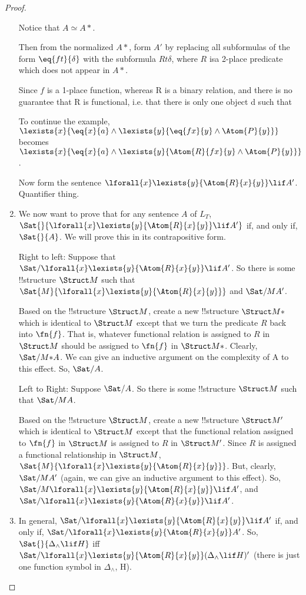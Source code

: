 \documentclass[../../include/open-logic-section]{subfiles}
\begin{document}
\begin{proof}
\begin{enumerate}
Notice that $ A \simeq A*$.

Then from the normalized $A*$, form $A'$ by replacing all subformulas of
the form $\eq{ft}{\delta}$ with the subformula $R{t}{\delta}$, where $R$
isa 2-place predicate which does not appear in $A*$.

Since $f$ is a 1-place function, whereas R is a binary relation, and there
is no guarantee that R is functional, i.e. that there is only one object d
such that

To continue the example, $\lexists{x}{\eq{x}{a} \land
\lexists{y}{\eq{fx}{y} \land \Atom{P}{y}}}$ becomes $\lexists{x}{\eq{x}{a}
\land \lexists{y}{\Atom{R}{fx}{y} \land \Atom{P}{y}}}$.

Now form the sentence $\lforall{x}\lexists{y}{\Atom{R}{x}{y}}\lif A'$.
Quantifier thing.

\item We now want to prove that for any sentence $A$ of $L_T$,
$\Sat{}{\lforall{x}\lexists{y}{\Atom{R}{x}{y}}\lif A'}$ if, and only if,
$\Sat{}{A}$. We will prove this in its contrapositive form.

Right to left: Suppose that
$\Sat/{}{\lforall{x}\lexists{y}{\Atom{R}{x}{y}}\lif A'}$. So there is some
!!{structure} $\Struct M$ such that
$\Sat{M}{\lforall{x}\lexists{y}{\Atom{R}{x}{y}}}$ and $\Sat/{M}{A'}$.

Based on the !!{structure} $\Struct M$, create a new !!{structure}
$\Struct M*$ which is identical to $\Struct M$ except that we turn the
predicate $R$ back into $\fn{f}$. That is, whatever functional relation is
assigned to $R$ in $\Struct M$ should be assigned to $\fn{f}$ in
$\Struct M*$. Clearly, $\Sat/{M*}{A}$. We can give an inductive argument
on the complexity of A to this effect. So, $\Sat/{}{A}$.

Left to Right: Suppose $\Sat/{}{A}$. So there is some !!{structure}
$\Struct M$ such that $\Sat/{M}{A}$.

Based on the !!{structure} $\Struct M$, create a new !!{structure}
$\Struct M'$ which is identical to $\Struct M$ except that the functional
relation assigned to $\fn{f}$ in $\Struct M$ is assigned to $R$ in
$\Struct M'$. Since $R$ is assigned a functional relationship in
$\Struct M$, $\Sat{M}{\lforall{x}\lexists{y}{\Atom{R}{x}{y}}}$. But,
clearly, $\Sat/{M}{A'}$ (again, we can give an inductive argument to this
effect). So, $\Sat/{M}{\lforall{x}\lexists{y}{\Atom{R}{x}{y}}\lif A'}$,
and$\Sat/{}{\lforall{x}\lexists{y}{\Atom{R}{x}{y}}\lif A'}$.

\item In general, $\Sat/{}{\lforall{x}\lexists{y}{\Atom{R}{x}{y}}\lif A'}$
if, and only if, $\Sat/{\lforall{x}\lexists{y}{\Atom{R}{x}{y}}}{A'}$. So,
$\Sat{}{\Delta_\land \lif H}$ iff
$\Sat/{\lforall{x}\lexists{y}{\Atom{R}{x}{y}}}{(\Delta_\land \lif H)'}$
(there is just one function symbol in $\Delta_\land$, H).


\end{enumerate}
\end{proof}
\end{document}
